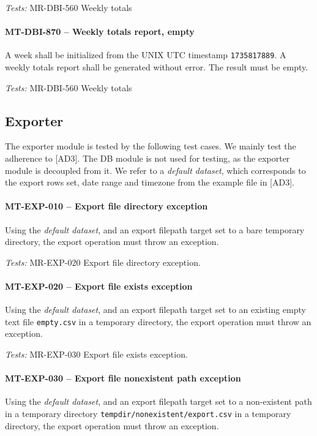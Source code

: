 \textit{Tests: } MR-DBI-560 Weekly totals

\paragraph{MT-DBI-870 -- Weekly totals report, empty}
A week shall be initialized from the UNIX UTC timestamp
\lstinline{1735817889}. A weekly totals report shall be generated without error.
The result must be empty.

\textit{Tests: } MR-DBI-560 Weekly totals

\subsection{Exporter}
The exporter module is tested by the following test cases.
We mainly test the adherence to [AD3].
The DB module is not used for testing, as the exporter module
is decoupled from it.
We refer to a \emph{default dataset}, which corresponds to
the export rows set, date range and timezone from the example
file in [AD3].

\paragraph{MT-EXP-010 -- Export file directory exception}
Using the \emph{default dataset}, and an export filepath target
set to a bare temporary directory, the export operation
must throw an exception.

\textit{Tests: } MR-EXP-020 Export file directory exception.

\paragraph{MT-EXP-020 -- Export file exists exception}
Using the \emph{default dataset}, and an export filepath target
set to an existing empty text file \lstinline{empty.csv} in a temporary
directory, the export operation must throw an exception.

\textit{Tests: } MR-EXP-030 Export file exists exception.

\paragraph{MT-EXP-030 -- Export file nonexistent path exception}
Using the \emph{default dataset}, and an export filepath target
set to a non-existent path in a temporary directory
\lstinline{tempdir/nonexistent/export.csv} in a temporary
directory, the export operation must throw an exception.

